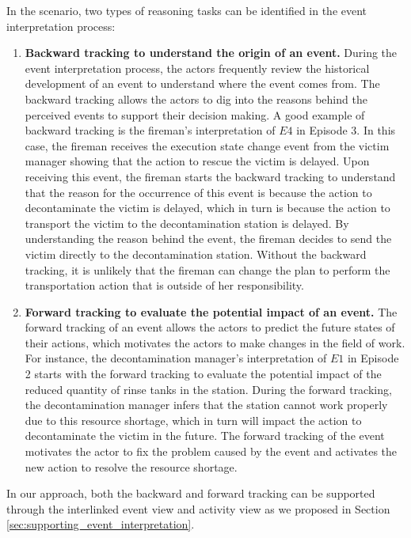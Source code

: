 In the scenario, two types of reasoning tasks can be identified in the event interpretation process:

\begin{enumerate}
	\item \textbf{Backward tracking to understand the origin of an event.} During the event interpretation process, the actors frequently review the historical development of an event to understand where the event comes from. The backward tracking allows the actors to dig into the reasons behind the perceived events to support their decision making. A good example of backward tracking is the fireman's interpretation of $E4$ in Episode 3. In this case, the fireman receives the execution state change event from the victim manager showing that the action to rescue the victim is delayed. Upon receiving this event, the fireman starts the backward tracking to understand that the reason for the occurrence of this event is because the action to decontaminate the victim is delayed, which in turn is because the action to transport the victim to the decontamination station is delayed. By understanding the reason behind the event, the fireman decides to send the victim directly to the decontamination station. Without the backward tracking, it is unlikely that the fireman can change the plan to perform the transportation action that is outside of her responsibility.
	\item \textbf{Forward tracking to evaluate the potential impact of an event.} The forward tracking of an event allows the actors to predict the future states of their actions, which motivates the actors to make changes in the field of work. For instance, the decontamination manager's interpretation of $E1$ in Episode 2 starts with the forward tracking to evaluate the potential impact of the reduced quantity of rinse tanks in the station. During the forward tracking, the decontamination manager infers that the station cannot work properly due to this resource shortage, which in turn will impact the action to decontaminate the victim in the future. The forward tracking of the event motivates the actor to fix the problem caused by the event and activates the new action to resolve the resource shortage.
\end{enumerate}

In our approach, both the backward and forward tracking can be supported through the interlinked event view and activity view as we proposed in Section \ref{sec:supporting_event_interpretation}. 

